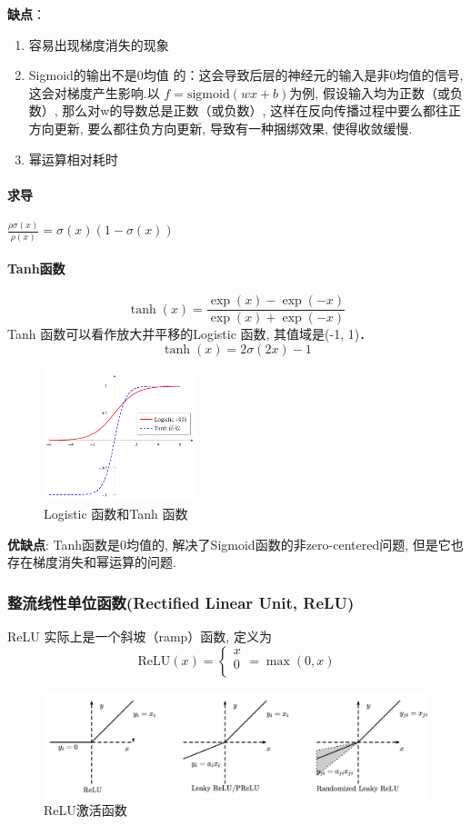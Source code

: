 \documentclass[a4paper]{article}
\theoremstyle{definition}
\numberwithin{equation}{section}
\begin{document}
\textbf{缺点}：
\begin{enumerate}
    \renewcommand{\labelenumi}{(\theenumi)}
    \item 容易出现梯度消失的现象 
   \item Sigmoid的输出不是0均值 的：这会导致后层的神经元的输入是非0均值的信号, 这会对梯度产生影响.以 $f=\mathrm{sigmoid}(wx+b)$为例,  假设输入均为正数（或负数）, 那么对w的导数总是正数（或负数）, 这样在反向传播过程中要么都往正方向更新, 要么都往负方向更新, 导致有一种捆绑效果, 使得收敛缓慢.
    \item 幂运算相对耗时 
\end{enumerate}
\paragraph{求导}
$ \frac{\rho \sigma(x)}{\rho(x)}=\sigma(x)(1-\sigma(x))$
​	 
\paragraph{Tanh函数}
$$\tanh(x)=\frac{\exp(x)-\exp(-x)}{\exp(x)+\exp(-x)} $$
Tanh 函数可以看作放大并平移的Logistic 函数, 其值域是(-1,  1)．
$$\tanh(x) = 2 \sigma (2x)-1$$

\begin{figure}[!ht]
    \centering
    \includegraphics[width=0.4\textwidth]{sigmoid_function.png}
    \caption{Logistic 函数和Tanh 函数}
\end{figure}

\textbf{优缺点}:
Tanh函数是0均值的, 解决了Sigmoid函数的非zero-centered问题, 但是它也存在梯度消失和幂运算的问题.


\subsubsection{整流线性单位函数(Rectified Linear Unit,  ReLU)}
ReLU 实际上是一个斜坡（ramp）函数, 定义为
$$\mathrm{ReLU}(x)=
\left\{ 
\begin{array}{c}    x \\    0  \\   \end{array}
\right. =\max(0, x)
$$
\begin{figure}[!ht]
    \centering
    \includegraphics[width=\textwidth]{ReLU}
    \caption{ReLU激活函数}
\end{figure}
\end{document}
